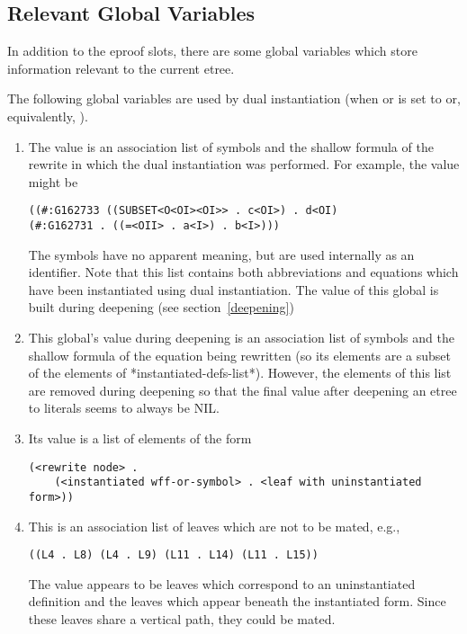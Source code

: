 \subsection{Relevant Global Variables}

In addition to the eproof slots, there are some global variables 
which store information relevant to the current etree.

The following global variables are used by dual instantiation
(when
 or 
is set to  or, equivalently, ).
\begin{enumerate}
\item {}
The value is an association list of symbols and the shallow formula of the
rewrite in which the dual instantiation was performed.  For example,
the value might be
\begin{verbatim}
((#:G162733 ((SUBSET<O<OI><OI>> . c<OI>) . d<OI) 
(#:G162731 . ((=<OII> . a<I>) . b<I>)))
\end{verbatim}
The symbols have no apparent meaning, but are used internally as an identifier.
Note that this list contains both abbreviations and equations which have been
instantiated using dual instantiation.  The value of this global is built during
deepening (see section~\ref{deepening})
\item {}  
This global's value during deepening is an association list of symbols and the shallow
formula of the equation being rewritten (so its elements are a subset of the
elements of *instantiated-defs-list*).
However, the elements of this list are removed during deepening so that
the final value after deepening an etree to literals seems to always be NIL.
\item {}
Its value is a list of elements of the form 
\begin{verbatim}
(<rewrite node> . 
    (<instantiated wff-or-symbol> . <leaf with uninstantiated form>))
\end{verbatim}
\item {}  This is an association list of leaves which are not to be mated, e.g.,
\begin{verbatim}
((L4 . L8) (L4 . L9) (L11 . L14) (L11 . L15))
\end{verbatim}
The value appears to be leaves which correspond to an uninstantiated definition and the leaves which
appear beneath the instantiated form.  Since these leaves share a vertical path, they could be mated.

\end{enumerate}
